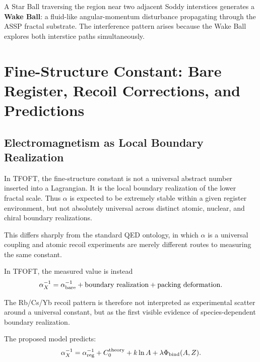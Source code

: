 \documentclass[11pt,a4paper]{article}
\begin{document}
    A Star Ball traversing the region near two adjacent Soddy interstices generates a \textbf{Wake Ball}: a fluid-like angular-momentum disturbance propagating through the ASSP fractal substrate. The interference pattern arises because the Wake Ball explores both interstice paths simultaneously.


\section{Fine-Structure Constant: Bare Register, Recoil Corrections, and Predictions}

  \subsection{Electromagnetism as Local Boundary Realization}
 
    In TFOFT, the fine-structure constant is not a universal abstract number inserted into a Lagrangian. It is the local boundary realization of the lower fractal scale. Thus \(\alpha\) is expected to be extremely stable within a given register environment, but not absolutely universal across distinct atomic, nuclear, and chiral boundary realizations. 

    This differs sharply from the standard QED ontology, in which \(\alpha\) is a universal coupling and atomic recoil experiments are merely different routes to measuring the same constant.

    In TFOFT, the measured value is instead
    \begin{equation}
    \alpha_X^{-1}
    =
    \alpha_{\rm bare}^{-1}
    +
    \mathrm{boundary\ realization}
    +
    \mathrm{packing\ deformation}.
    \end{equation}

    The Rb/Cs/Yb recoil pattern is therefore not interpreted as experimental scatter around a universal constant, but as the first visible evidence of species-dependent boundary realization.

    The proposed model predicts:
    \begin{equation}
    \alpha_X^{-1}
    =
    \alpha_{\rm reg}^{-1}
    +
    C_0^{\rm theory}
    +
    k\ln A
    +
    \lambda\Phi_{\rm bind}(A,Z).
    \end{equation}
\end{document}
